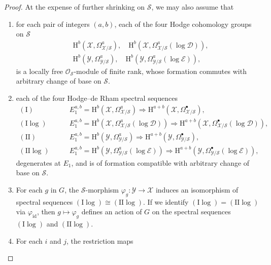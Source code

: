 \begin{proof}
At the expense of further shrinking on \(\mathcal{S}\), we may also assume that
\begin{enumerate}[label=(\arabic*)]
\item for each pair of integers \((a,b)\), each of the four Hodge cohomology groups on \(\mathcal{S}\)
\[
\begin{aligned}
&\mathrm{H}^b(\mathcal{X},\Omega^a_{\mathcal{X}/\mathcal{S}}),\quad
\mathrm{H}^b(\mathcal{X},\Omega^a_{\mathcal{X}/\mathcal{S}}(\log\mathcal{D})),\\
&\mathrm{H}^b(\mathcal{Y},\Omega^a_{\mathcal{Y}/\mathcal{S}}),\quad
\mathrm{H}^b(\mathcal{Y},\Omega^a_{\mathcal{Y}/\mathcal{S}}(\log\mathcal{E})),
\end{aligned}
\]
is a locally free \(\mathcal{O}_{\mathcal{S}}\)-module of finite rank, whose formation commutes with arbitrary change of base on \(\mathcal{S}\).
\item each of the four Hodge--de Rham spectral sequences
\[
\begin{aligned}
(\mathrm{I})\qquad &E_1^{a,b}=\mathrm{H}^b(\mathcal{X},\Omega^a_{\mathcal{X}/\mathcal{S}})\Rightarrow
\mathrm{H}^{a+b}(\mathcal{X},\Omega^\bullet_{\mathcal{X}/\mathcal{S}}),\\
(\mathrm{I}\log)\qquad &E_1^{a,b}=\mathrm{H}^b(\mathcal{X},\Omega^a_{\mathcal{X}/\mathcal{S}}(\log\mathcal{D}))\Rightarrow
\mathrm{H}^{a+b}(\mathcal{X},\Omega^\bullet_{\mathcal{X}/\mathcal{S}}(\log\mathcal{D})),\\
(\mathrm{II})\qquad &E_1^{a,b}=\mathrm{H}^b(\mathcal{Y},\Omega^a_{\mathcal{Y}/\mathcal{S}})\Rightarrow
\mathrm{H}^{a+b}(\mathcal{Y},\Omega^\bullet_{\mathcal{Y}/\mathcal{S}}),\\
(\mathrm{II}\log)\qquad &E_1^{a,b}=\mathrm{H}^b(\mathcal{Y},\Omega^a_{\mathcal{Y}/\mathcal{S}}(\log\mathcal{E}))\Rightarrow
\mathrm{H}^{a+b}(\mathcal{Y},\Omega^\bullet_{\mathcal{Y}/\mathcal{S}}(\log\mathcal{E})),
\end{aligned}
\]
degenerates at \(E_1\), and is of formation compatible with arbitrary change of base on \(\mathcal{S}\).
\item For each \(g\) in \(G\), the \(\mathcal{S}\)-morphism \(\varphi_g:\mathcal{Y}\to\mathcal{X}\) induces an isomorphism of spectral sequences \((\mathrm{I}\log)\cong(\mathrm{II}\log)\). If we identify \((\mathrm{I}\log)=(\mathrm{II}\log)\) via \(\varphi_{\mathrm{id}}\), then \(g\mapsto\varphi_g\) defines an action of \(G\) on the spectral sequences \((\mathrm{I}\log)\) and \((\mathrm{II}\log)\).
\item For each \(i\) and \(j\), the restriction maps

\end{enumerate}
\end{proof}
